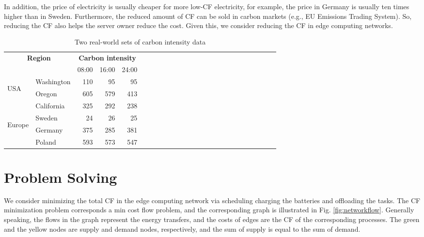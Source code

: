 \documentclass[conference, 10pt, ﬁnal, letterpaper, twocolumn]{IEEEtran}
\begin{document}
In addition, the price of electricity is usually cheaper for more low-CF electricity, for example, the price in Germany is usually ten times higher than in Sweden. Furthermore, the reduced amount of CF can be sold in carbon markets (e.g., EU Emissions Trading System). So, reducing the CF also helps the server owner reduce the cost. Given this, we consider reducing the CF in edge computing networks.

\begin{table}[h]
    \caption{\label{tab:data}Two real-world sets of carbon intensity data}
    \begin{center}
        \begin{tabular}{*{5}{llrrr}}
            \toprule
            \midrule
             \multicolumn{2}{c}{\multirow{2}{*}{\bf Region}} & \multicolumn{3}{c}{\bf Carbon intensity}\\
             \cmidrule(lr){3-5}
            \multicolumn{2}{c}{} & 08:00 & 16:00 & 24:00 \\
            \midrule
             \multirow{3}{*}{\begin{turn}{90} USA \end{turn}} & Washington & 110 & 95  & 95\\
             & Oregon & 605 & 579 & 413\\
             & California & 325 & 292  & 238\\
            \midrule
             \multirow{3}{*}{\begin{turn}{90} Europe \end{turn}} & Sweden & 24 & 26 & 25\\
             & Germany & 375 & 285 & 381\\
             & Poland & 593 & 573 & 547\\
            \midrule
            \bottomrule
        \end{tabular}
    \end{center}
\end{table}


\section{Problem Solving}



We consider minimizing the total CF in the edge computing network via scheduling charging the batteries and offloading the tasks. The CF minimization problem corresponds a min cost flow problem, and the corresponding graph is illustrated in Fig. \ref{fig:networkflow}. Generally speaking, the flows in the graph represent the energy transfers, and the costs of edges are the CF of the corresponding processes. The green and the yellow nodes are supply and demand nodes, respectively, and the sum of supply is equal to the sum of demand.
\end{document}
